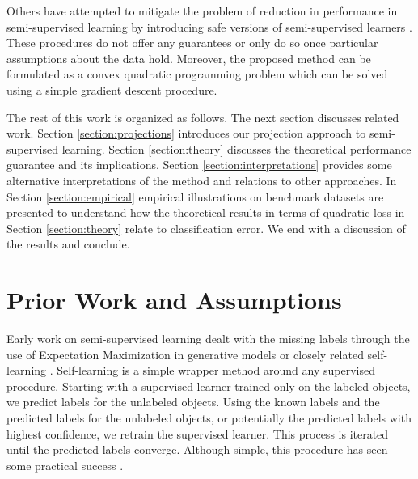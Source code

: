 \documentclass[sts,preprint]{imsart-custom}
\begin{document}
Others have attempted to mitigate the problem of reduction in performance in semi-supervised learning by introducing safe versions of semi-supervised learners \citep{Li2011,Loog2010,Loog2014a}. These procedures do not offer any guarantees or only do so once particular assumptions about the data hold. Moreover, the proposed method can be formulated as a convex quadratic programming problem which can be solved using a simple gradient descent procedure.


The rest of this work is organized as follows. The next section discusses related work. Section \ref{section:projections} introduces our projection approach to semi-supervised learning. Section \ref{section:theory} discusses the theoretical performance guarantee and its implications. Section \ref{section:interpretations} provides some alternative interpretations of the method and relations to other approaches. In Section \ref{section:empirical} empirical illustrations on benchmark datasets are presented to understand how the theoretical results in terms of quadratic loss in Section \ref{section:theory} relate to classification error. We end with a discussion of the results and conclude.

\section{Prior Work and Assumptions}

Early work on semi-supervised learning dealt with the missing labels through the use of Expectation Maximization in generative models or closely related self-learning \citep{McLachlan1975}. Self-learning is a simple wrapper method around any supervised procedure. Starting with a supervised learner trained only on the labeled objects, we predict labels for the unlabeled objects. Using the known labels and the predicted labels for the unlabeled objects, or potentially the predicted labels with highest confidence, we retrain the supervised learner. This process is iterated until the predicted labels converge. Although simple, this procedure has seen some practical success \citep{Nigam2000}.
\end{document}
